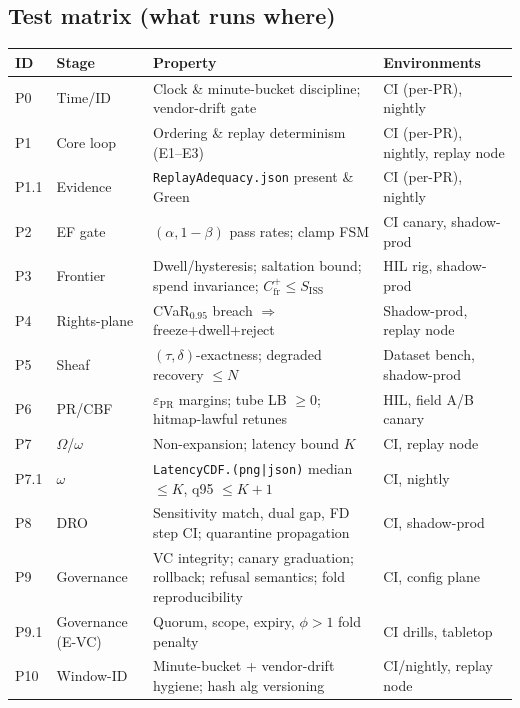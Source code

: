 \documentclass[10pt]{article}
\providecommand{\constsymPRmargin}{\varepsilon_{\mathrm{PR}}}
\newcommand{\epsPR}{\constsymPRmargin}
\newcommand{\SISS}{S_{\mathrm{ISS}}}
\begin{document}
\subsection*{Test matrix (what runs where)}
\begin{center}
\renewcommand{\arraystretch}{1.15}
\begin{tabularx}{\textwidth}{@{} l l X X @{}}
\toprule
\textbf{ID} & \textbf{Stage} & \textbf{Property} & \textbf{Environments} \\
\midrule
P0 & Time/ID & Clock \& minute-bucket discipline; vendor-drift gate & CI (per-PR), nightly \\
P1 & Core loop & Ordering \& replay determinism (E1–E3) & CI (per-PR), nightly, replay node \\
P1.1 & Evidence & \texttt{ReplayAdequacy.json} present \& Green & CI (per-PR), nightly \\
P2 & EF gate & $(\alpha,1{-}\beta)$ pass rates; clamp FSM & CI canary, shadow-prod \\
P3 & Frontier & Dwell/hysteresis; saltation bound; spend invariance; $C_{\mathrm{fr}}^{+}\le\SISS$ & HIL rig, shadow-prod \\
P4 & Rights-plane & CVaR$_{0.95}$ breach $\Rightarrow$ freeze+dwell+reject & Shadow-prod, replay node \\
P5 & Sheaf & $(\tau,\delta)$-exactness; degraded recovery $\le N$ & Dataset bench, shadow-prod \\
P6 & PR/CBF & $\epsPR$ margins; tube LB $\ge 0$; hitmap-lawful retunes & HIL, field A/B canary \\
P7 & $\Omega$/$\omega$ & Non-expansion; latency bound $K$ & CI, replay node \\
P7.1 & $\omega$ & \texttt{LatencyCDF.(png|json)} median $\le K$, q95 $\le K{+}1$ & CI, nightly \\
P8 & DRO & Sensitivity match, dual gap, FD step CI; quarantine propagation & CI, shadow-prod \\
P9 & Governance & VC integrity; canary graduation; rollback; refusal semantics; fold reproducibility & CI, config plane \\
P9.1 & Governance (E-VC) & Quorum, scope, expiry, $\phi>1$ fold penalty & CI drills, tabletop \\
P10 & Window-ID & Minute-bucket + vendor-drift hygiene; hash alg versioning & CI/nightly, replay node \\
\bottomrule
\end{tabularx}
\end{center}
\end{document}
